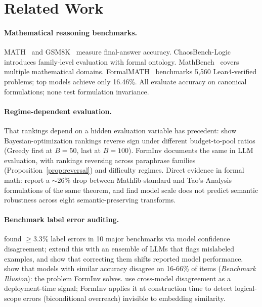 \documentclass{article}
\begin{document}
\section{Related Work}
\label{sec:related}

\paragraph{Mathematical reasoning benchmarks.}
MATH~\citep{hendrycks2021math} and GSM8K~\citep{cobbe2021gsm} measure final-answer accuracy.
ChaosBench-Logic~\citep{chaosbench2026} introduces family-level evaluation with formal ontology.
MathBench~\citep{liu2024mathbench} covers multiple mathematical domains.
FormalMATH~\citep{yu2025formalmath} benchmarks 5,560 Lean4-verified problems; top models achieve only 16.46\%.
All evaluate accuracy on canonical formulations; none test formulation invariance.

\paragraph{Regime-dependent evaluation.}
That rankings depend on a hidden evaluation variable has precedent: \citet{regimeeval2026} show Bayesian-optimization rankings reverse sign under different budget-to-pool ratios (Greedy first at $B=50$, last at $B=100$). FormInv documents the same in LLM evaluation, with rankings reversing across paraphrase families (Proposition~\ref{prop:reversal}) and difficulty regimes. Direct evidence in formal math: \citet{taylor2026taobench} report a $\sim$26\% drop between Mathlib-standard and Tao's-Analysis formulations of the same theorem, and \citet{dezarza2026semantic} find model scale does not predict semantic robustness across eight semantic-preserving transforms.

\paragraph{Benchmark label error auditing.}
\citet{northcutt2021pervasive} found $\geq 3.3\%$ label errors in 10 major benchmarks via model confidence disagreement;
\citet{guo2024llmbetter} extend this with an ensemble of LLMs that flags mislabeled examples, and show that correcting them shifts reported model performance.
\citet{yang2026illusion} show that models with similar accuracy disagree on 16-66\% of items (\emph{Benchmark Illusion}): the problem FormInv solves.
\citet{gorbett2026crossmodel} use cross-model disagreement as a deployment-time signal; FormInv applies it at construction time to detect logical-scope errors (biconditional overreach) invisible to embedding similarity.
\end{document}
